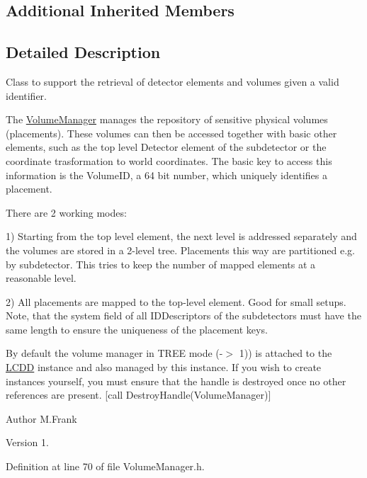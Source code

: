 \subsection*{Additional Inherited Members}


\subsection{Detailed Description}
Class to support the retrieval of detector elements and volumes given a valid identifier. 

The \hyperlink{class_d_d4hep_1_1_geometry_1_1_volume_manager}{Volume\+Manager} manages the repository of sensitive physical volumes (placements). These volumes can then be accessed together with basic other elements, such as the top level Detector element of the subdetector or the coordinate trasformation to world coordinates. The basic key to access this information is the \textquotesingle{}Volume\+ID\textquotesingle{}, a 64 bit number, which uniquely identifies a placement.

There are 2 working modes\+:

1) Starting from the top level element, the next level is addressed separately and the volumes are stored in a 2-\/level \textquotesingle{}tree\textquotesingle{}. Placements this way are partitioned e.\+g. \textquotesingle{}by subdetector\textquotesingle{}. This tries to keep the number of mapped elements at a reasonable level.

2) All placements are mapped to the top-\/level element. Good for small setups. Note, that the system field of all I\+D\+Descriptors of the subdetectors must have the same length to ensure the uniqueness of the placement keys.

By default the volume manager in T\+R\+EE mode (-\/$>$ 1)) is attached to the \hyperlink{class_d_d4hep_1_1_geometry_1_1_l_c_d_d}{L\+C\+DD} instance and also managed by this instance. If you wish to create instances yourself, you must ensure that the handle is destroyed once no other references are present. \mbox{[}call Destroy\+Handle(\+Volume\+Manager)\mbox{]}

\begin{DoxyAuthor}{Author}
M.\+Frank 
\end{DoxyAuthor}
\begin{DoxyVersion}{Version}
1. 
\end{DoxyVersion}


Definition at line 70 of file Volume\+Manager.\+h.



